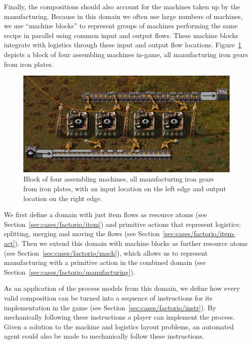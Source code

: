 \documentclass[class=smolathesis,crop=false]{standalone}
\begin{document}
Finally, the compositions should also account for the machines taken up by the manufacturing.
Because in this domain we often use large numbers of machines, we use ``machine blocks'' to represent groups of machines performing the same recipe in parallel using common input and output flows.
These machine blocks integrate with logistics through these input and output flow locations.
Figure~\ref{fig:factorio_machine-block} depicts a block of four assembling machines in-game, all manufacturing iron gears from iron plates.

\begin{figure}[p]
  \centering
  \includegraphics[width=\textwidth]{img/factorio_machine-block.png}
  \caption{Block of four assembling machines, all manufacturing iron gears from iron plates, with an input location on the left edge and output location on the right edge.}
  \label{fig:factorio_machine-block}
\end{figure}

We first define a domain with just item flows as resource atoms (see Section~\ref{sec:cases/factorio/item}) and primitive actions that represent logistics: splitting, merging and moving the flows (see Section~\ref{sec:cases/factorio/item-act}).
Then we extend this domain with machine blocks as further resource atoms (see Section~\ref{sec:cases/factorio/mach}), which allows us to represent manufacturing with a primitive action in the combined domain (see Section~\ref{sec:cases/factorio/manufacturing}).

As an application of the process models from this domain, we define how every valid composition can be turned into a sequence of instructions for its implementation in the game (see Section~\ref{sec:cases/factorio/instr}).
By mechanically following these instructions a player can implement the process.
Given a solution to the machine and logistics layout problems, an automated agent could also be made to mechanically follow these instructions.
\end{document}
